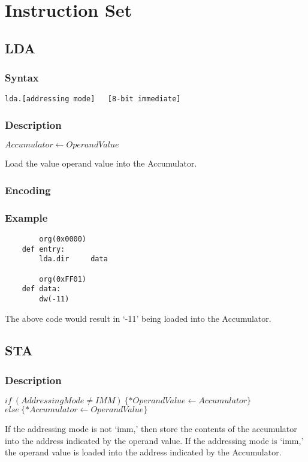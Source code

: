 \section{Instruction Set}\label{sec:instruction-set}
\pagebreak
\subsection{LDA}\label{subsec:lda}
    \subsubsection{Syntax}
    \begin{verbatim}lda.[addressing mode]   [8-bit immediate] \end{verbatim}
    \subsubsection{Description}
    $Accumulator \leftarrow OperandValue$
    \par Load the value operand value into the Accumulator.

    \subsubsection{Encoding}
    \subsubsection{Example}
    \begin{verbatim}
        org(0x0000)
    def entry:
        lda.dir     data

        org(0xFF01)
    def data:
        dw(-11)
    \end{verbatim}
    \par The above code would result in `-11' being loaded into the Accumulator.

\pagebreak
\subsection{STA}\label{subsec:sta}
    \subsubsection{Description}
    $if\ (AddressingMode \neq IMM)\ \{ *OperandValue \leftarrow Accumulator \}$ \\
    $else\ \{ *Accumulator \leftarrow OperandValue \}$
    \par If the addressing mode is not `imm,' then store the contents of the accumulator into the address indicated by
    the operand value.
    If the addressing mode is `imm,' the operand value is loaded into the address indicated by the Accumulator.

